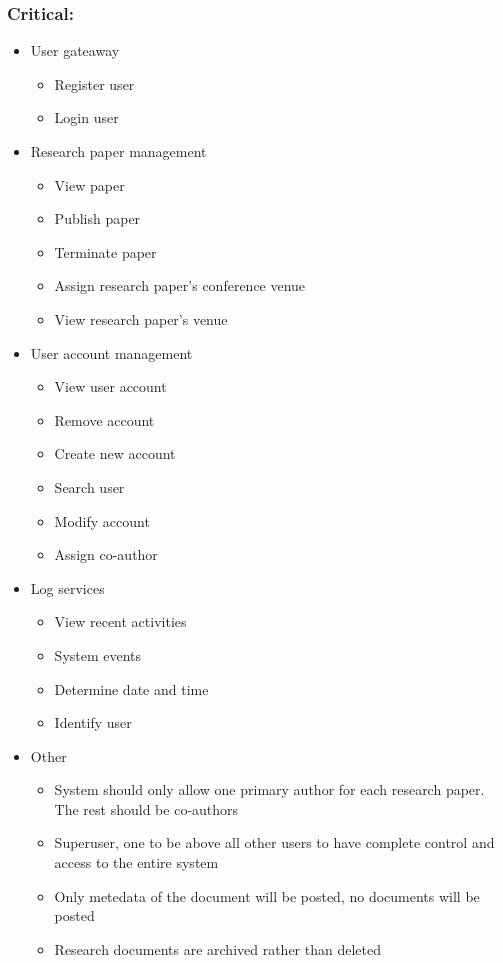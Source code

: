 \documentclass[11pt]{article}
\begin{document}
	\subsubsection{Critical:}
	\begin{itemize}
		\item User gateaway
		\begin{itemize}
			\item Register user
			\item Login user
		\end{itemize}
		\item Research paper management
		\begin{itemize}
			\item View paper
			\item Publish paper
			\item Terminate paper
			\item Assign research paper's conference venue
			\item View research paper's venue
		\end{itemize}
		\item User account management
		\begin{itemize}
			\item View user account
			\item Remove account
			\item Create new account
			\item Search user
			\item Modify account
			\item Assign co-author
		\end{itemize}
		\item Log services
		\begin{itemize}
			\item View recent activities
			\item System events
			\item Determine date and time
			\item Identify user
		\end{itemize}
		\item Other
		\begin{itemize}
			\item System should only allow one primary author for each research paper. The rest should be co-authors
			\item Superuser, one to be above all other users to have complete control and access to the entire system
			\item Only metedata of the document will be posted, no documents will be posted
			\item Research documents are archived rather than deleted
		\end{itemize}
		
	\end{itemize}
	
\end{document}
